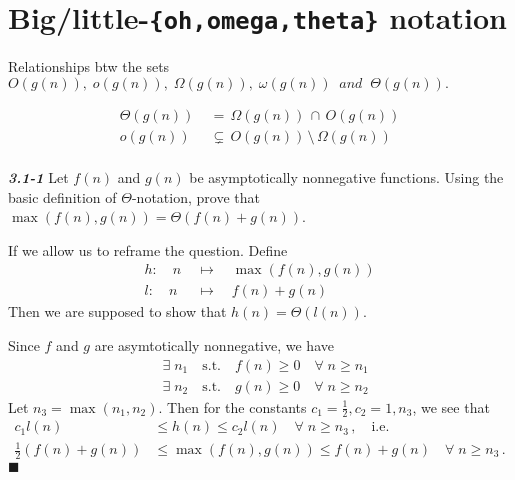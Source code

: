 \documentclass{article}
\begin{document}
\section{Big/little-\texttt{\{oh,omega,theta\}} notation}
Relationships btw the sets $O(g(n)),\; o(g(n)),\; \Omega(g(n)),\; \omega(g(n))\;\; and\;\; \Theta(g(n)).$ 

  \begin{align*}
    \Theta(g(n))\; &=\, \Omega(g(n)) \,\cap\, O(g(n)) \\
    o(g(n)) &\subsetneq\, O(g(n)) \,\setminus\, \Omega\left(g(n)\right) \\
  \end{align*}


\noindent
\textbf{\textsl{3.1-1}}
Let $f(n)$ and $g(n)$ be asymptotically nonnegative functions. Using the basic definition of $\Theta$-notation,
prove that $\max\left(f(n), g(n)\right) = \Theta(f(n) + g(n))$.
\newline
\newline

If we allow us to reframe the question. Define
\begin{align*}
	h \!:\quad n \;&\mapsto\quad \max(f(n), g(n)) \\
	l \!:\quad n \;&\mapsto\quad f(n) + g(n)
\end{align*}
Then we are supposed to show that $h(n) = \Theta(l(n))$.

\noindent
Since $f$ and $g$ are asymtotically nonnegative, we have
\begin{align*}
	& \exists\; n_1 \quad\textrm{s.t.}\quad f(n) \ge 0 \quad\forall\; n \ge n_1 \\
	& \exists\; n_2 \quad\textrm{s.t.}\quad g(n) \ge 0 \quad\forall\; n \ge n_2
\end{align*}
Let $n_3 = \max(n_1, n_2)$. Then for the constants $c_1=\frac{1}{2}, c_2=1, n_3$, we see that
\begin{align*}
	c_1 l(n) &\le h(n) \le c_2 l(n) \quad\forall\; n \ge n_3\,, \quad \textrm{i.e.}\\
	\frac{1}{2}(f(n) + g(n)) &\le \max\left(f(n), g(n)\right) \le f(n) + g(n) \quad\forall\; n \ge n_3\,.
\end{align*}
\hfill$\blacksquare$
\end{document}
